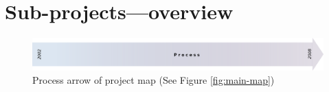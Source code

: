 
\newpage
\section{Sub-projects---overview}
\label{sec:overview}

\begin{figure}[!ht]
  \centering
  \includegraphics[width=\textwidth]{img/process}
  \caption{Process arrow of project map (See Figure \ref{fig:main-map})}
\end{figure}

